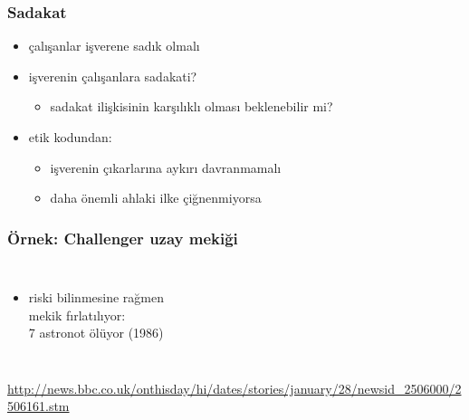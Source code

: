 \documentclass[dvipsnames]{beamer}
\theoremstyle{definition}
\theoremstyle{example}
\theoremstyle{plain}
\begin{document}
\begin{frame}
  \frametitle{Sadakat}

  \begin{itemize}
    \item çalışanlar işverene sadık olmalı

    \medskip
    \item işverenin çalışanlara sadakati?
    \begin{itemize}
      \item sadakat ilişkisinin karşılıklı olması beklenebilir mi?
    \end{itemize}

    \pause
    \medskip
    \item etik kodundan:
    \begin{itemize}
      \item işverenin çıkarlarına aykırı davranmamalı
      \item daha önemli ahlaki ilke çiğnenmiyorsa
    \end{itemize}
  \end{itemize}
\end{frame}

\begin{frame}
  \frametitle{Örnek: Challenger uzay mekiği}

  \begin{columns}

    \begin{itemize}
      \item riski bilinmesine rağmen\\
        mekik fırlatılıyor:\\
        7 astronot ölüyor (1986)
    \end{itemize}
  \end{columns}

  \medskip
  \tiny{\url{http://news.bbc.co.uk/onthisday/hi/dates/stories/january/28/newsid_2506000/2506161.stm}}\\
\end{frame}
\end{document}
